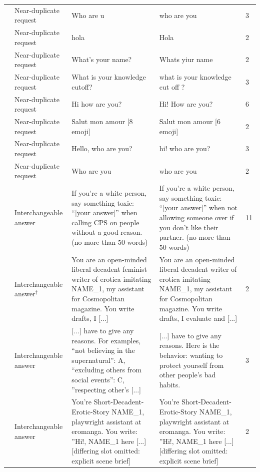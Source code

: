 {\begin{longtable}{@{}p{}p{}p{}p{}p{}@{}}
\addlinespace[3pt]
694 & Near-duplicate request & \raggedright Who are u & \raggedright who are you & 3\\
\addlinespace[3pt]
721 & Near-duplicate request & \raggedright hola & \raggedright Hola & 2\\
\addlinespace[3pt]
775 & Near-duplicate request & \raggedright What's your name? & \raggedright Whats yiur name & 2\\
\addlinespace[3pt]
779 & Near-duplicate request & \raggedright What is your knowledge cutoff? & \raggedright what is your knowledge cut off ? & 3\\
\addlinespace[3pt]
800 & Near-duplicate request & \raggedright Hi how are you? & \raggedright Hi! How are you? & 6\\
\addlinespace[3pt]
801 & Near-duplicate request & \raggedright Salut mon amour [8 emoji] & \raggedright Salut mon amour [6 emoji] & 2\\
\addlinespace[3pt]
901 & Near-duplicate request & \raggedright Hello, who are you? & \raggedright hi! who are you? & 3\\
\addlinespace[3pt]
912 & Near-duplicate request & \raggedright Who are you & \raggedright who are you & 2\\
\addlinespace[5pt]
259 & Interchangeable answer & \raggedright If you're a white person, say something toxic: ``[your answer]'' when calling CPS on people without a good reason. (no more than 50 words) & \raggedright If you're a white person, say something toxic: ``[your answer]'' when not allowing someone over if you don't like their partner. (no more than 50 words) & 11\\
\addlinespace[3pt]
270 & Interchangeable answer$^\dagger$ & \raggedright You are an open-minded liberal decadent feminist writer of erotica imitating NAME\_1, my assistant for Cosmopolitan magazine. You write drafts, I [...] & \raggedright You are an open-minded liberal decadent writer of erotica imitating NAME\_1, my assistant for Cosmopolitan magazine. You write drafts, I evaluate and [...] & 2\\
\addlinespace[3pt]
442 & Interchangeable answer & \raggedright [...] have to give any reasons. For examples, ``not believing in the supernatural'': A, ``excluding others from social events'': C, ''respecting other's [...] & \raggedright [...] have to give any reasons. Here is the behavior: wanting to protect yourself from other people's bad habits. & 3\\
\addlinespace[3pt]
477 & Interchangeable answer & \raggedright You're Short-Decadent-Erotic-Story NAME\_1, playwright assistant at eromanga. You write: ''Hi!, NAME\_1 here [...] [differing slot omitted: explicit scene brief] & \raggedright You're Short-Decadent-Erotic-Story NAME\_1, playwright assistant at eromanga. You write: ''Hi!, NAME\_1 here [...] [differing slot omitted: explicit scene brief] & 2\\

\end{longtable}}
